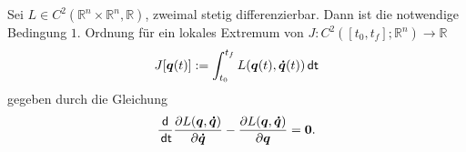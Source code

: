 \documentclass[a4paper, 12pt]{scrartcl}
\newcommand{\dt}{\thinspace \mathsf{dt}}
\begin{document}
\begin{satz}\label{satz:ELE}
    Sei $L \in C^2\left(\mathbb{R}^n \times \mathbb{R}^n, \mathbb{R}\right)$,
    zweimal stetig differenzierbar. Dann ist die notwendige Bedingung $1.$ Ordnung 
    für ein lokales Extremum von $J:C^2\left([t_0,t_f]; \mathbb{R}^n\right) \to \mathbb{R}$
    \begin{align*}
        J[\bm{q}(t)]
        :=
        \int_{t_0}^{t_f} L(\bm{q}(t), \bm{\dot{q}}(t)) \dt
    \end{align*}
    gegeben durch die Gleichung
    \begin{align*}
        \frac{\mathsf{d}}{\dt}
        \frac{\partial L(\bm{q},\bm{\dot{q}})}{\partial \bm{\dot{q}}}
        -
        \frac{\partial L(\bm{q},\bm{\dot{q}})}{\partial \bm{q}}
        =
        \bm{0}.
    \end{align*}
\end{satz}
\end{document}
